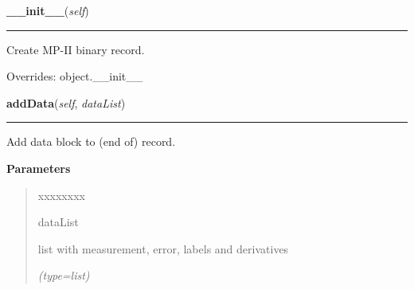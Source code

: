 \hspace{.8\funcindent}\begin{boxedminipage}{\funcwidth}

    \raggedright \textbf{\_\_init\_\_}(\textit{self})

    \vspace{-1.5ex}

    \rule{\textwidth}{0.5\fboxrule}
\setlength{\parskip}{2ex}
    Create MP-II binary record.

\setlength{\parskip}{1ex}
      Overrides: object.\_\_init\_\_

    \end{boxedminipage}

    \label{mille:MilleRecord:addData}

    \vspace{0.5ex}

\hspace{.8\funcindent}\begin{boxedminipage}{\funcwidth}

    \raggedright \textbf{addData}(\textit{self}, \textit{dataList})

    \vspace{-1.5ex}

    \rule{\textwidth}{0.5\fboxrule}
\setlength{\parskip}{2ex}
    Add data block to (end of) record.

\setlength{\parskip}{1ex}
      \textbf{Parameters}
      \vspace{-1ex}

      \begin{quote}
        \begin{Ventry}{xxxxxxxx}

          \item[dataList]

          list with measurement, error, labels and derivatives

            {\it (type=list)}

        \end{Ventry}

      \end{quote}

    \end{boxedminipage}

    \label{mille:MilleRecord:getData}

